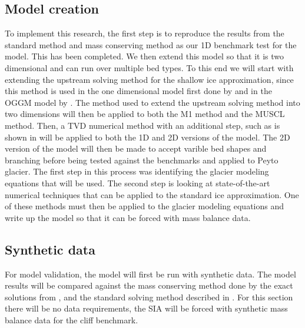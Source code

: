 \documentclass{article}
\begin{document}
\subsection{Model creation}
To implement this research, the first step is to reproduce the results from the standard method and \citet{Jarosch2013} mass conserving method as our 1D benchmark test for the model. This has been completed. We then extend this model so that it is two dimensional and can run over multiple bed types. To this end we will start with extending the upstream solving method for the shallow ice approximation, since this method is used in the one dimensional model first done by \citet{Jarosch2013} and in the OGGM model by \citet{Maussion2019}. The method used to extend the upstream solving method into two dimensions will then be applied to both the M1 method and the MUSCL method. Then, a TVD numerical method with an additional step, such as is shown in \citet{Gottlieb1996} will be applied to both the 1D and 2D versions of the model. The 2D version of the model will then be made to accept varible bed shapes and branching before being tested against the benchmarks and applied to Peyto glacier. The first step in this process was identifying the glacier modeling equations that will be used. The second step is looking at state-of-the-art numerical techniques that can be applied to the standard ice approximation. One of these methods must then be applied to the glacier modeling equations and write up the model so that it can be forced with mass balance data.
\subsection{Synthetic data}
For model validation, the model will first be run with synthetic data. The model results will be compared against the mass conserving method done by \citet{Jarosch2013} the exact solutions from \citet{Bueler2005}, and the standard solving method described in \citet{Jarosch2013, Hindmarsh1996}. For this section there will be no data requirements, the SIA will be forced with synthetic mass balance data for the cliff benchmark. 
\end{document}
